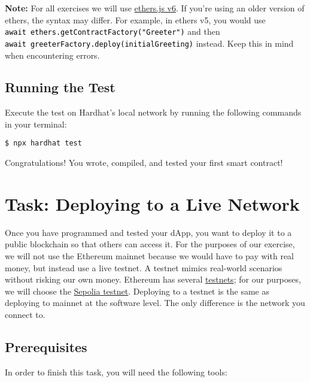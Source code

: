 \documentclass[12pt]{article}
\newcommand{\codegrey}[1]{%
  \texttt{\colorbox{black!4}{\textcolor{black}{#1}}}%
}
\begin{document}
\noindent
\textbf{Note:} For all exercises we will use \href{https://docs.ethers.org/v6/}{ethers.js v6}. If you're using an older version of ethers, the syntax may differ. For example, in ethers v5, you would use \\ \codegrey{await ethers.getContractFactory("Greeter")} and then \\ \codegrey{await greeterFactory.deploy(initialGreeting)} instead. Keep this in mind when encountering errors.

\subsection{Running the Test}

Execute the test on Hardhat's local network by running the following commands in your terminal:

\begin{verbatim}
$ npx hardhat test
\end{verbatim}
Congratulations! You wrote, compiled, and tested your first smart contract!

\section{Task: Deploying to a Live Network}

Once you have programmed and tested your dApp, you want to deploy it to a public blockchain so that others can access it. For the purposes of our exercise, we will not use the Ethereum mainnet because we would have to pay with real money, but instead use a live testnet. A testnet mimics real-world scenarios without risking our own money. Ethereum has several \href{https://ethereum.org/en/developers/docs/networks/#ethereum-testnets}{testnets}; for our purposes, we will choose the \href{https://sepolia.dev/}{Sepolia testnet}. Deploying to a testnet is the same as deploying to mainnet at the software level. The only difference is the network you connect to.

\subsection{Prerequisites}

In order to finish this task, you will need the following tools:
\end{document}
